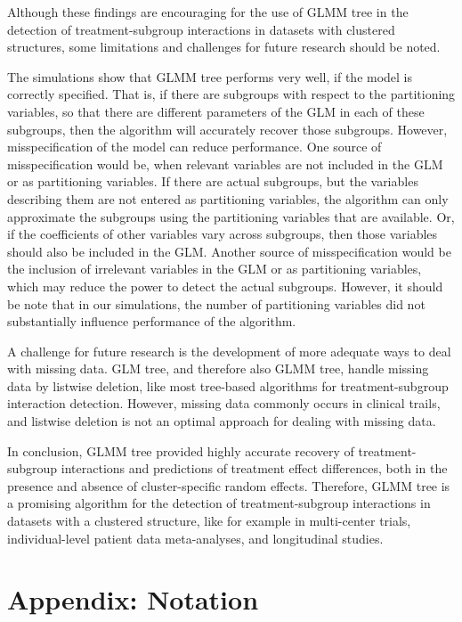 \documentclass[nobf,doc]{apa}
\begin{document}
Although these findings are encouraging for the use of GLMM tree in the detection of treatment-subgroup interactions in datasets with clustered structures, some limitations and challenges for future research should be noted.

The simulations show that GLMM tree performs very well, if the model is correctly specified. That is, if there are subgroups with respect to the partitioning variables, so that there are different parameters of the GLM in each of these subgroups, then the algorithm will accurately recover those subgroups. However, misspecification of the model can reduce performance. One source of misspecification would be, when relevant variables are not included in the GLM or as partitioning variables. If there are actual subgroups, but the variables describing them are not entered as partitioning variables, the algorithm can only approximate the subgroups using the partitioning variables that are available. Or, if the coefficients of other variables vary across subgroups, then those variables should also be included in the GLM. Another source of misspecification would be the inclusion of irrelevant variables in the GLM or as partitioning variables, which may reduce the power to detect the actual subgroups. However, it should be note that in our simulations, the number of partitioning variables did not substantially influence performance of the algorithm. 
  
A challenge for future research is the development of more adequate ways to deal with missing data. GLM tree, and therefore also GLMM tree, handle missing data by listwise deletion, like most tree-based algorithms for treatment-subgroup interaction detection. However, missing data commonly occurs in clinical trails, and listwise deletion is not an optimal approach for dealing with missing data.

In conclusion, GLMM tree provided highly accurate recovery of treatment-subgroup interactions and predictions of treatment effect differences, both in the presence and absence of cluster-specific random effects. Therefore, GLMM tree is a promising algorithm for the detection of treatment-subgroup interactions in datasets with a clustered structure, like for example in multi-center trials, individual-level patient data meta-analyses, and longitudinal studies.

\nolinenumbers




\section{Appendix: Notation}
\end{document}
